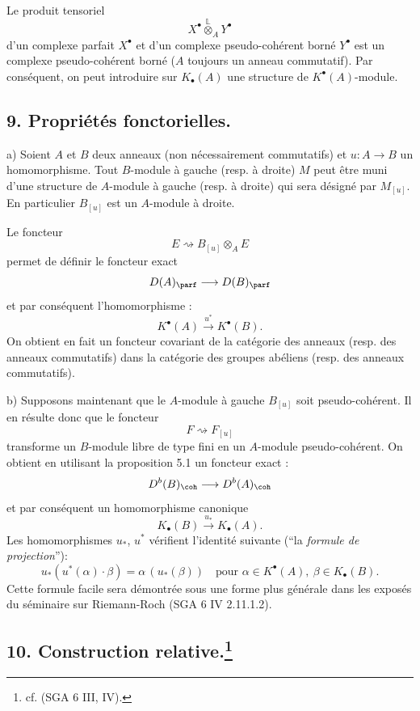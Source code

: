 Le produit tensoriel
\[
X^\bullet\overset{\mathbb{L}}{\otimes}_A Y^\bullet
\]
d'un complexe parfait $X^\bullet$ et d'un complexe pseudo-cohérent borné $Y^\bullet$ est un complexe pseudo-cohérent borné ($A$ toujours un anneau commutatif). Par conséquent, on peut introduire sur $K_\bullet(A)$ une structure de $K^{\bullet}(A)$-module.

\subsection*{9. Propriétés fonctorielles.}

a) Soient $A$ et $B$ deux anneaux (non nécessairement commutatifs) et $u:A\to B$ un homomorphisme. Tout $B$-module à gauche (resp. à droite) $M$ peut être muni d'une structure de $A$-module à gauche (resp. à droite) qui sera désigné par $M_{[u]}$. En particulier $B_{[u]}$ est un $A$-module à droite.

Le foncteur
\[
E\rightsquigarrow B_{[u]}\otimes_A E
\]
permet de définir le foncteur exact
\[
D(A)_{\parf}\longrightarrow D(B)_{\parf}
\]
et par conséquent l'homomorphisme :
\[
K^{\bullet}(A)\xrightarrow{u^*}K^{\bullet}(B).
\]
On obtient en fait un foncteur covariant de la catégorie des anneaux (resp. des anneaux commutatifs) dans la catégorie des groupes abéliens (resp. des anneaux commutatifs).

b) Supposons maintenant que le $A$-module à gauche $B_{[u]}$ soit pseudo-cohérent. Il en résulte donc que le foncteur
\[
F\rightsquigarrow F_{[u]}
\]
transforme un $B$-module libre de type fini en un $A$-module pseudo-cohérent. On obtient en utilisant la proposition 5.1 un foncteur exact :
\[
D^b(B)_{\coh}\longrightarrow D^b(A)_{\coh}
\]
et par
conséquent un homomorphisme canonique
\[
K_\bullet(B)\xrightarrow{u_*}K_\bullet(A).
\]
Les homomorphismes $u_*$, $u^*$ vérifient l'identité suivante (``la \emph{formule de projection}''):
\[
u_*(u^*(\alpha)\cdot \beta)=\alpha\,(u_*(\beta))
\quad\text{pour }\alpha\in K^{\bullet}(A),\ \beta\in K_\bullet(B).
\]
Cette formule facile sera démontrée sous une forme plus générale dans les exposés du séminaire sur Riemann-Roch (SGA 6 IV 2.11.1.2).

\subsection*{10. Construction relative.\footnote{cf. (SGA 6 III, IV).}}

